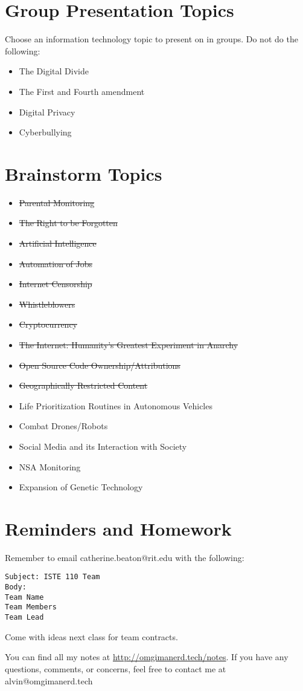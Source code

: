 \documentclass[letterpaper, 12pt]{article}
\begin{document}
\section*{Group Presentation Topics}
Choose an information technology topic to present on in groups. Do not do the
following:
\begin{itemize}
  \item The Digital Divide
  \item The First and Fourth amendment
  \item Digital Privacy
  \item Cyberbullying
\end{itemize}

\section*{Brainstorm Topics}
\begin{itemize}
  \item \sout{Parental Monitoring}
  \item \sout{The Right to be Forgotten}
  \item \sout{Artificial Intelligence}
  \item \sout{Automation of Jobs}
  \item \sout{Internet Censorship}
  \item \sout{Whistleblowers}
  \item \sout{Cryptocurrency}
  \item \sout{The Internet: Humanity's Greatest Experiment in Anarchy}
  \item \sout{Open Source Code Ownership/Attributions}
  \item \sout{Geographically Restricted Content}
  \item Life Prioritization Routines in Autonomous Vehicles
  \item Combat Drones/Robots
  \item Social Media and its Interaction with Society
  \item NSA Monitoring
  \item Expansion of Genetic Technology
\end{itemize}

\section*{Reminders and Homework}
Remember to email catherine.beaton@rit.edu with the following:
\begin{verbatim}
Subject: ISTE 110 Team
Body:
Team Name
Team Members
Team Lead
\end{verbatim}
Come with ideas next class for team contracts.

\begin{center}
  You can find all my notes at \url{http://omgimanerd.tech/notes}. If you have
  any questions, comments, or concerns, feel free to contact me at
  alvin@omgimanerd.tech
\end{center}
\end{document}
